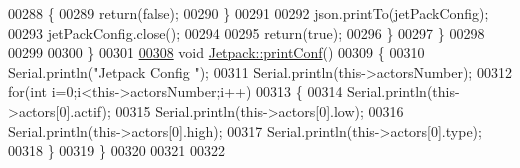 \begin{DoxyCode}
00288             \{
00289                 \textcolor{keywordflow}{return}(\textcolor{keyword}{false});          
00290             \}  
00291 
00292             json.printTo(jetPackConfig);
00293             jetPackConfig.close();      
00294             
00295             \textcolor{keywordflow}{return}(\textcolor{keyword}{true}); 
00296         \}
00297     \}   
00298     
00299 
00300 \}
00301 
\hyperlink{class_jetpack_ac54a7bb4f9166bee32052253d9b1d306}{00308} \textcolor{keywordtype}{void} \hyperlink{class_jetpack_ac54a7bb4f9166bee32052253d9b1d306}{Jetpack::printConf}()
00309 \{
00310     Serial.println(\textcolor{stringliteral}{"Jetpack Config "});
00311     Serial.println(this->actorsNumber); 
00312         \textcolor{keywordflow}{for}(\textcolor{keywordtype}{int} i=0;i<this->actorsNumber;i++)
00313     \{
00314     Serial.println(this->actors[0].actif);
00315     Serial.println(this->actors[0].low);
00316     Serial.println(this->actors[0].high);
00317     Serial.println(this->actors[0].type); 
00318     \}
00319 \}
00320  
00321 
00322 
\end{DoxyCode}
